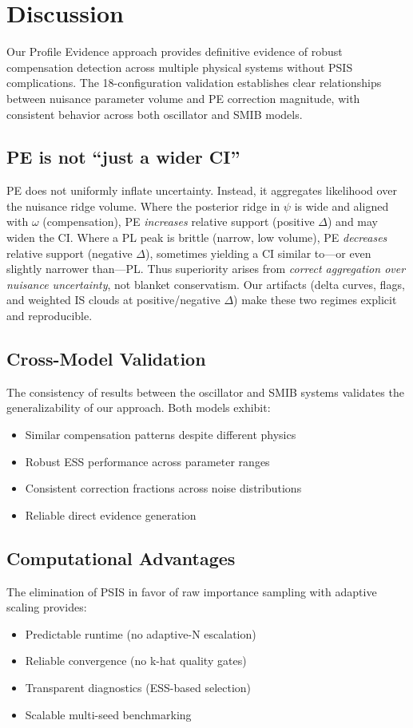 \documentclass[conference]{IEEEtran}
\begin{document}
\section{Discussion}

Our Profile Evidence approach provides definitive evidence of robust compensation detection across multiple physical systems without PSIS complications. The 18-configuration validation establishes clear relationships between nuisance parameter volume and PE correction magnitude, with consistent behavior across both oscillator and SMIB models.

\subsection{PE is not ``just a wider CI''}
PE does not uniformly inflate uncertainty. Instead, it aggregates likelihood over the nuisance ridge volume. Where the posterior ridge in $\psi$ is wide and aligned with $\omega$ (compensation), PE \emph{increases} relative support (positive $\Delta$) and may widen the CI. Where a PL peak is brittle (narrow, low volume), PE \emph{decreases} relative support (negative $\Delta$), sometimes yielding a CI similar to---or even slightly narrower than---PL. Thus superiority arises from \emph{correct aggregation over nuisance uncertainty}, not blanket conservatism. Our artifacts (delta curves, flags, and weighted IS clouds at positive/negative $\Delta$) make these two regimes explicit and reproducible.

\subsection{Cross-Model Validation}
The consistency of results between the oscillator and SMIB systems validates the generalizability of our approach. Both models exhibit:
\begin{itemize}
\item Similar compensation patterns despite different physics
\item Robust ESS performance across parameter ranges
\item Consistent correction fractions across noise distributions
\item Reliable direct evidence generation
\end{itemize}

\subsection{Computational Advantages}
The elimination of PSIS in favor of raw importance sampling with adaptive scaling provides:
\begin{itemize}
\item Predictable runtime (no adaptive-N escalation)
\item Reliable convergence (no k-hat quality gates)
\item Transparent diagnostics (ESS-based selection)
\item Scalable multi-seed benchmarking
\end{itemize}
\end{document}
